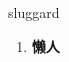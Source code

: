 
\begin{frame}
{\huge sluggard}
\begin{center}
\begin{enumerate}\Large
  \item \textbf{懒人}
\end{enumerate}
\end{center}
\end{frame}
